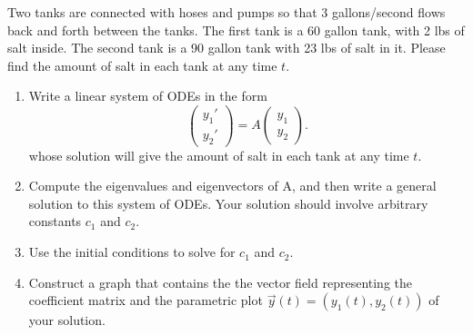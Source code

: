 \begin{problem}
 Two tanks are connected with hoses and pumps so that 3 gallons/second flows back and forth between the tanks.  The first tank is a 60 gallon tank, with 2 lbs of salt inside.  The second tank is a 90 gallon tank with 23 lbs of salt in it. Please find the amount of salt in each tank at any time $t$. 
\begin{enumerate}
 \item Write a linear system of ODEs in the form 
$$
\begin{pmatrix}
 y_1'\\y_2'
\end{pmatrix}
=
A
\begin{pmatrix}
 y_1\\y_2
\end{pmatrix}.
$$
whose solution will give the amount of salt in each tank at any time $t$.
 \item Compute the eigenvalues and eigenvectors of A, and then write a general solution to this system of ODEs. Your solution should involve arbitrary constants $c_1$ and $c_2$.
 \item Use the initial conditions to solve for $c_1$ and $c_2$.
 \item 
{}%
Construct a graph that contains the the vector field representing the coefficient matrix and the parametric plot $\vec y(t) = (y_1(t),y_2(t))$ of your solution.
\end{enumerate}

\end{problem}



